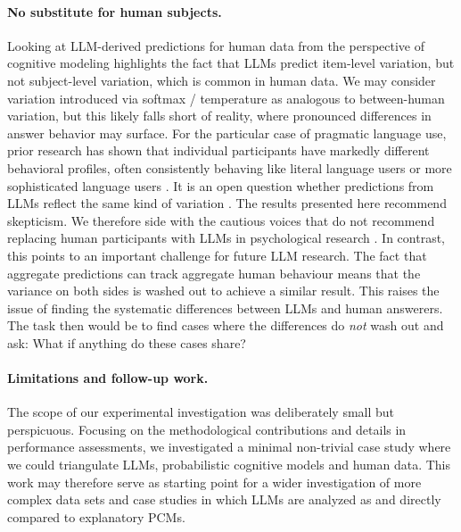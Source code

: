 \documentclass[fleqn]{article}
\begin{document}
\paragraph{No substitute for human subjects.}
Looking at LLM-derived predictions for human data from the perspective of cognitive modeling highlights the fact that LLMs predict item-level variation, but not subject-level variation, which is common in human data.
We may consider variation introduced via softmax / temperature as analogous to between-human variation, but this likely falls short of reality, where pronounced differences in answer behavior may surface.
For the particular case of pragmatic language use, prior research has shown that individual participants have markedly different behavioral profiles, often consistently behaving like literal language users or more sophisticated language users \citep[e.g.,][]{NieuwlandDitman2010:On-the-incremen,FrankeDegen2015:Reasoning-in-Re,SpychalskaKontinen2016:Investigating-s}.
It is an open question whether predictions from LLMs reflect the same kind of variation \citep[][]{AherArriaga2023:Using-large-lan,SalewskiAlaniz2023:In-Context-Impe}.
The results presented here recommend skepticism.
We therefore side with the cautious voices that do not recommend replacing human participants with LLMs in psychological research \citep{DillionTandon2023:Can-AI-language,HardingDAlessandro2023:AI-language-mod}.
In contrast, this points to an important challenge for future LLM research.
The fact that aggregate predictions can track aggregate human behaviour means that the variance on both sides is washed out to achieve a similar result.
This raises the issue of finding the systematic differences between LLMs and human answerers.
The task then would be to find cases where the differences do \emph{not} wash out and ask: What if anything do these cases share?

\paragraph{Limitations and follow-up work.}
The scope of our experimental investigation was deliberately small but perspicuous.
Focusing on the methodological contributions and details in performance assessments, we investigated a minimal non-trivial case study where we could triangulate LLMs, probabilistic cognitive models and human data.
This work may therefore serve as starting point for a wider investigation of more complex data sets and case studies in which LLMs are analyzed as and directly compared to explanatory PCMs.
\end{document}
